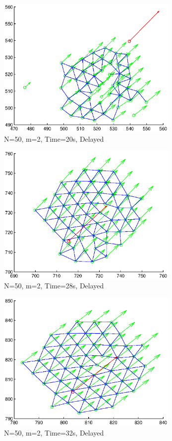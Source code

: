 \documentclass[10pt, conference]{IEEEtran}
\begin{document}
\begin{figure}[!h]
  \begin{center}
    \includegraphics[width=3.45in]{n50m2vmax100amax1000t20delay}
  \end{center}

  \caption{\small N=50, m=2, Time=20s, Delayed}
  \label{fig:n50m2vmax100amax1000t20delay}
\end{figure}

\begin{figure}[!h]
  \begin{center}
    \includegraphics[width=3.45in]{n50m2vmax100amax1000t28delay}
  \end{center}

  \caption{\small N=50, m=2, Time=28s, Delayed}
  \label{fig:n50m2vmax100amax1000t28delay}
\end{figure}

\begin{figure}[!h]
  \begin{center}
    \includegraphics[width=3.45in]{n50m2vmax100amax1000t32delay}
  \end{center}

  \caption{\small N=50, m=2, Time=32s, Delayed}
  \label{fig:n50m2vmax100amax1000t32delay}
\end{figure}
\end{document}
